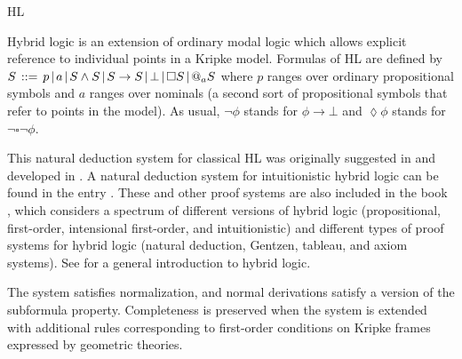 \begin{entry}{HL}
\begin{clarifications}
Hybrid logic is an extension of ordinary modal logic which allows explicit reference to individual points in a Kripke model. Formulas of HL are defined by 
$S \hspace{.5mm} ::= \hspace{.5mm} p \hspace{.5mm} | \hspace{.5mm} a
\hspace{.5mm} | \hspace{.5mm} S \wedge S \hspace{.5mm} | \hspace{.5mm}
S \rightarrow S \hspace{.5mm} | \hspace{.5mm} \bot \hspace{.5mm} |
\hspace{.5mm} \square S \hspace{.5mm} | \hspace{.5mm} @_{a} S$
where $p$ ranges over ordinary propositional symbols and $a$ ranges
over nominals (a second sort of propositional symbols that refer to points in the model). As usual, $\neg \phi$ stands for $ \phi
\rightarrow \bot$ and $\lozenge \phi$ stands for $\neg \square \neg \phi$. 
\end{clarifications}

\begin{history}
This natural deduction system for classical HL was originally suggested in
\cite{Brauner01c} and developed in \cite{Brauner01b}. A natural deduction system for intuitionistic hybrid logic can be found in the entry . These and other proof systems are also included in the book \cite{Brauner11a}, which considers a spectrum of different versions of hybrid logic
(propositional, first-order, intensional first-order, and intuitionistic)
and different types of proof systems for
hybrid logic (natural deduction, Gentzen, tableau, and axiom systems). See \cite{AC06} for a general introduction to hybrid logic.
\end{history}

\begin{technicalities}
The system satisfies normalization, and normal derivations satisfy a version of the subformula property. Completeness is preserved when the system is extended with additional rules corresponding to first-order conditions on Kripke frames expressed by geometric theories.
\end{technicalities}

\end{entry}
